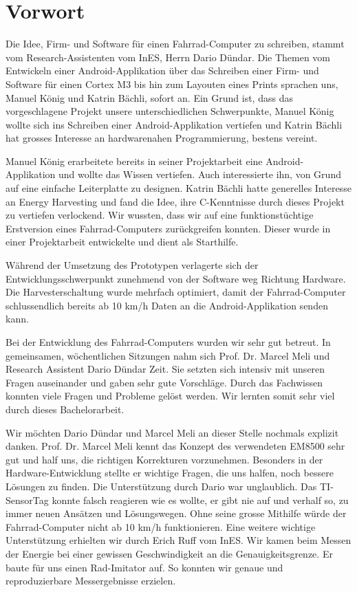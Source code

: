 \chapter*{Vorwort}

Die Idee, Firm- und Software für einen Fahrrad-Computer zu schreiben, stammt vom Research-Assistenten vom InES, Herrn Dario Dündar. Die Themen vom Entwickeln einer Android-Applikation über das Schreiben einer Firm- und Software für einen Cortex M3 bis hin zum Layouten eines Prints sprachen uns, Manuel König und Katrin Bächli, sofort an. Ein Grund ist, dass das vorgeschlagene Projekt unsere unterschiedlichen Schwerpunkte, Manuel König wollte sich ins Schreiben einer Android-Applikation vertiefen und Katrin Bächli hat grosses Interesse an hardwarenahen Programmierung, bestens vereint.  

Manuel König erarbeitete bereits in seiner Projektarbeit eine Android-Applikation und wollte das Wissen vertiefen. Auch interessierte ihn, von Grund auf eine einfache Leiterplatte zu designen. Katrin Bächli hatte generelles Interesse an Energy Harvesting und fand die Idee, ihre C-Kenntnisse durch dieses Projekt zu vertiefen verlockend. Wir wussten, dass wir auf eine funktionstüchtige Erstversion eines Fahrrad-Computers zurückgreifen konnten. Dieser wurde in einer Projektarbeit entwickelte und dient als Starthilfe.

Während der Umsetzung des Prototypen verlagerte sich der Entwicklungsschwerpunkt zunehmend von der Software weg Richtung Hardware. Die Harvesterschaltung wurde mehrfach optimiert, damit der Fahrrad-Computer schlussendlich bereits ab 10 km/h Daten an die Android-Applikation senden kann.

Bei der Entwicklung des Fahrrad-Computers wurden wir sehr gut betreut. In gemeinsamen, wöchentlichen Sitzungen nahm sich Prof. Dr. Marcel Meli und Research Assistent Dario Dündar Zeit. Sie setzten sich intensiv mit unseren Fragen auseinander und gaben sehr gute Vorschläge. Durch das Fachwissen konnten viele Fragen und Probleme gelöst werden. Wir lernten somit sehr viel durch dieses Bachelorarbeit. 

Wir möchten Dario Dündar und Marcel Meli an dieser Stelle nochmals explizit danken. Prof. Dr. Marcel Meli kennt das Konzept des verwendeten EM8500 sehr gut und half uns, die richtigen Korrekturen vorzunehmen. Besonders in der Hardware-Entwicklung stellte er wichtige Fragen, die uns halfen, noch bessere Lösungen zu finden. Die Unterstützung durch Dario war unglaublich. Das TI-SensorTag konnte falsch reagieren wie es wollte, er gibt nie auf und verhalf so, zu immer neuen Ansätzen und Lösungswegen. Ohne seine grosse Mithilfe würde der Fahrrad-Computer nicht ab 10 km/h funktionieren. Eine weitere wichtige Unterstützung erhielten wir durch Erich Ruff vom InES. Wir kamen beim Messen der Energie bei einer gewissen Geschwindigkeit an die Genauigkeitsgrenze. Er baute für uns einen Rad-Imitator auf. So konnten wir genaue und reproduzierbare Messergebnisse erzielen. 

